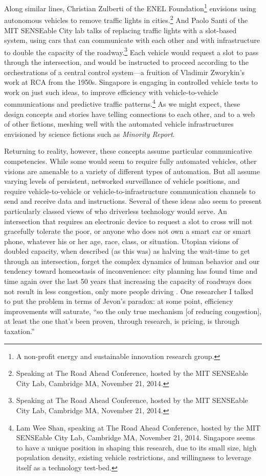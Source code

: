 Along similar
lines, Christian Zulberti of the ENEL Foundation\footnote{A non-profit
  energy and sustainable innovation research group.} envisions using
autonomous vehicles to remove traffic lights in
cities.\footnote{Speaking at The Road Ahead Conference, hosted by
  the MIT SENSEable City Lab, Cambridge MA, November 21, 2014.} And Paolo
Santi of the MIT SENSEable City lab talks of replacing traffic lights
with a slot-based system, using cars that can communicate with each
other and with infrastructure to double the capacity of the
roadway.\footnote{Speaking at The Road Ahead Conference, hosted by
  the MIT SENSEable City Lab, Cambridge MA, November 21, 2014.} Each vehicle would request a slot to pass through the
intersection, and would be instructed to proceed according to the
orchestrations of a central control system---a fruition of
Vladimir Zworykin's work at RCA from the 1950s. Singapore is engaging in
controlled vehicle tests to work on just such ideas, to improve
efficiency with vehicle-to-vehicle communications and predictive traffic
patterns.\footnote{Lam Wee Shan, speaking at The Road Ahead Conference, hosted by
  the MIT SENSEable City Lab, Cambridge MA, November 21, 2014.
  Singapore seems to have a unique position in shaping this research,
  due to its small size, high population density, existing vehicle
  restrictions, and willingness to 
  leverage itself as a technology test-bed.} As we
might expect, these
design concepts and stories have telling connections to each other, and
to a web of other fictions, meshing well with the automated vehicle
infrastructures envisioned by science fictions such as \emph{Minority Report}.

Returning to reality, however, these concepts assume particular
communicative competencies. While 
some would seem to require fully automated vehicles, other
visions are amenable to a variety of different types of automation.
But all assume varying levels of persistent, networked surveillance of
vehicle positions, and require vehicle-to-vehicle or
vehicle-to-infrastructure communication channels to send and receive
data and instructions. Several of these ideas also seem to present
particularly classed views of who driverless technology would serve.
An intersection that requires an electronic device to request a slot
to cross will not gracefully tolerate the poor, or anyone who
does not own a smart car or smart phone, whatever his or her age,
race, class, or situation. Utopian visions of doubled capacity, when
described (as this was) as halving the wait-time to get through an
intersection, forget the complex dynamics of human behavior and our
tendency toward homeostasis of inconvenience: city planning has found
time and time again over the last 50 years that increasing the
capacity of roadways does not result in less congestion, only more
people driving \cite[p. 219]{marshallFuture}. One researcher I talked
to put the problem in terms of Jevon's paradox: at some point,
efficiency improvements will saturate, ``so the only true mechanism
[of reducing congestion],
at least the one that's been proven, through research, is pricing, is
through taxation.''

